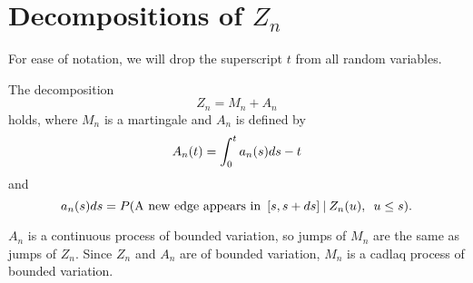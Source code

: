 

\section{Decompositions of $Z_n$}

For ease of notation, we will drop the superscript $t$ from all random variables.


\begin{lemma} \label{L: decomp Zn}
	The decomposition 
	\begin{equation} \label{E: decomp Zn}
	Z_n = M_n + A_n
	\end{equation}
	holds, where $M_n$ is a martingale and $A_n$ is defined by
	\begin{equation} \label{D: An}
	A_n(t) = \int_{0}^{t} a_n(s)ds - t
	\end{equation}
	and
	\begin{equation} \label{D: an}
	a_n(s)ds = P(\text{A new edge appears in} \enspace [s, s+ds] \: | \: Z_n(u), \enspace u \leq s).
	\end{equation}	
\end{lemma}
\begin{note} \label{N: decomp Zn}
	$A_n$ is a continuous process of bounded variation, so jumps of $M_n$ are the same as jumps of $Z_n$. Since $Z_n$ and $A_n$ are of bounded variation, $M_n$ is a cadlaq process of bounded variation.
\end{note}


